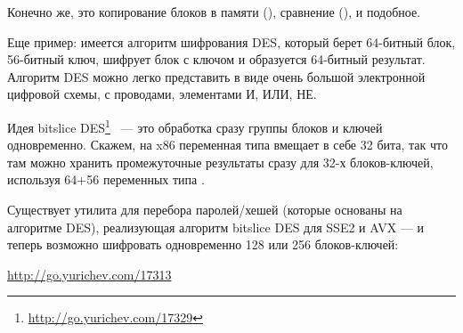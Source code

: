 Конечно же, это копирование блоков в памяти (), сравнение (), и подобное.

Еще пример: имеется алгоритм шифрования DES, который берет 64-битный блок, 56-битный ключ, 
шифрует блок с ключом и образуется 64-битный результат.
Алгоритм DES можно легко представить в виде очень большой электронной цифровой схемы, 
с проводами, элементами И, ИЛИ, НЕ.

\label{bitslicedes}
\newcommand{\URLBS}{\url{http://go.yurichev.com/17329}}

Идея bitslice DES\footnote{\URLBS} ~--- это обработка сразу группы блоков и ключей одновременно. 
Скажем, на x86 переменная типа  вмещает в себе 32 бита, так что там можно хранить 
промежуточные результаты сразу для 32-х блоков-ключей, используя 64+56 переменных типа .

\myindex{\oracle}
Существует утилита для перебора паролей/хешей \oracle (которые основаны на алгоритме DES), 
реализующая алгоритм bitslice DES для SSE2 и AVX --- и теперь возможно шифровать одновременно 
128 или 256 блоков-ключей:

\url{http://go.yurichev.com/17313}




